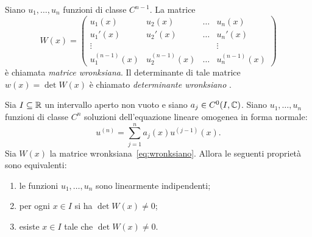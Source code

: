 \begin{definition}[wronksiano]
Siano $u_1, \dots, u_n$ funzioni di classe $C^{n-1}$.
La matrice
\begin{equation}\label{eq:wronksiano}
  W(x) =
    \begin{pmatrix}
    u_1(x) & u_2(x) & \dots & u_n(x) \\
    u_1'(x) & u_2'(x) & \dots & u_n'(x) \\
    \vdots & & & \vdots\\
    u_1^{(n-1)}(x) & u_2^{(n-1)}(x) & \dots & u_n^{(n-1)}(x)
    \end{pmatrix}
\end{equation}
è chiamata \emph{matrice wronksiana}.
%
%
%
%
Il determinante di tale matrice
$w(x) = \det W(x)$ è chiamato
\emph{determinante wronksiano}%
.
\end{definition}

\begin{theorem}%
\label{th:wronksiano}%
Sia $I\subseteq {\mathbb R}$ un intervallo aperto non vuoto e siano $a_j\in C^0(I,{\mathbb C})$.
Siano $u_1, \dots, u_n$ funzioni di classe $C^n$ soluzioni
dell'equazione lineare omogenea in forma normale:
\begin{equation}\label{eq:092784}
  u^{(n)} = \sum_{j=1}^n a_j(x) u^{(j-1)}(x).
\end{equation}
Sia $W(x)$ la matrice wronksiana~\eqref{eq:wronksiano}.
Allora le seguenti proprietà sono equivalenti:
\begin{enumerate}
\item \label{item:4736201} le funzioni $u_1,\dots, u_n$ sono linearmente indipendenti;
\item \label{item:4736202} per ogni $x\in I$ si ha $\det W(x)\neq 0$;
\item \label{item:4736203} esiste $x\in I$ tale che $\det W(x)\neq 0$.
\end{enumerate}
\end{theorem}

